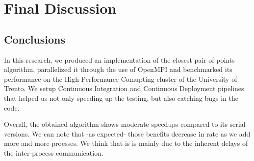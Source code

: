 \section{Final Discussion}
\label{sec:final_discussion}

\subsection{Conclusions}
In this research, we produced an implementation of the closest pair of points algorithm, parallelized it through the use of OpenMPI and benchmarked its performance on the High Performance Comupting cluster of the University of Trento.
We setup Continuous Integration and Continuous Deployment pipelines that helped us not only speeding up the testing, but also catching bugs in the code.

Overall, the obtained algorithm shows moderate speedups compared to its serial versions. We can note that -as expected- those benefits decrease in rate as we add more and more proesses. We think that is is mainly due to the inherent delays of the inter-process communication.

